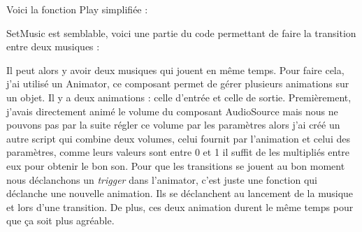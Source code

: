 \documentclass{article}
\begin{document}
Voici la fonction Play simplifiée :

SetMusic est semblable, voici une partie du code permettant de faire la transition entre deux musiques :



Il peut alors y avoir deux musiques qui jouent en même temps. Pour faire cela, j'ai utilisé un Animator, ce composant permet de gérer plusieurs animations sur un objet. Il y a deux animations : celle d'entrée et celle de sortie. Premièrement, j'avais directement animé le volume du composant AudioSource mais nous ne pouvons pas par la suite régler ce volume par les paramètres alors j'ai créé un autre script qui combine deux volumes, celui fournit par l'animation et celui des paramètres, comme leurs valeurs sont entre 0 et 1 il suffit de les multipliés entre eux pour obtenir le bon son. Pour que les transitions se jouent au bon moment nous déclanchons un \emph{trigger} dans l'animator, c'est juste une fonction qui déclanche une nouvelle animation. Ils se déclanchent au lancement de la musique et lors d'une transition. De plus, ces deux animation durent le même temps pour que ça soit plus agréable.







\end{document}
